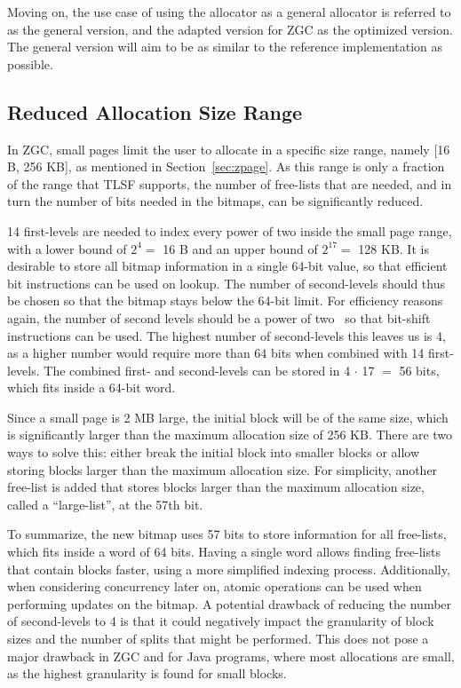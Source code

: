 Moving on, the use case of using the allocator as a general allocator is referred to as the general version, and the adapted version for ZGC as the optimized version. The general version will aim to be as similar to the reference implementation as possible.

\subsection{Reduced Allocation Size Range}
\label{sec:adaptations:reduced_allocation_range}

In ZGC, small pages limit the user to allocate in a specific size range, namely [16 B, 256 KB], as mentioned in Section~\ref{sec:zpage}. As this range is only a fraction of the range that TLSF supports, the number of free-lists that are needed, and in turn the number of bits needed in the bitmaps, can be significantly reduced.

14 first-levels are needed to index every power of two inside the small page range, with a lower bound of $2^4 =$ 16 B and an upper bound of $2^{17} =$ 128 KB. It is desirable to store all bitmap information in a single 64-bit value, so that efficient bit instructions can be used on lookup. The number of second-levels should thus be chosen so that the bitmap stays below the 64-bit limit. For efficiency reasons again, the number of second levels should be a power of two~\cite{TLSF} so that bit-shift instructions can be used. The highest number of second-levels this leaves us is 4, as a higher number would require more than 64 bits when combined with 14 first-levels. The combined first- and second-levels can be stored in 4 $\cdot$ 17 $=$ 56 bits, which fits inside a 64-bit word.

Since a small page is 2 MB large, the initial block will be of the same size, which is significantly larger than the maximum allocation size of 256 KB. There are two ways to solve this: either break the initial block into smaller blocks or allow storing blocks larger than the maximum allocation size. For simplicity, another free-list is added that stores blocks larger than the maximum allocation size, called a ``large-list'', at the 57th bit.

To summarize, the new bitmap uses 57 bits to store information for all free-lists, which fits inside a word of 64 bits. Having a single word allows finding free-lists that contain blocks faster, using a more simplified indexing process. Additionally, when considering concurrency later on, atomic operations can be used when performing updates on the bitmap. A potential drawback of reducing the number of second-levels to 4 is that it could negatively impact the granularity of block sizes and the number of splits that might be performed. This does not pose a major drawback in ZGC and for Java programs, where most allocations are small, as the highest granularity is found for small blocks.


